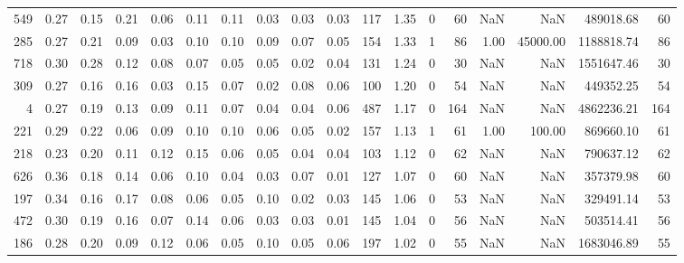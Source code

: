 \begin{tabular}{rrrrrrrrrrllrrrrrr}
          549 & 0.27 & 0.15 & 0.21 & 0.06 & 0.11 & 0.11 & 0.03 & 0.03 & 0.03 & 117 &  1.35 &                  0 &        60 &             NaN &                 NaN &     489018.68 &                    60 \\
          285 & 0.27 & 0.21 & 0.09 & 0.03 & 0.10 & 0.10 & 0.09 & 0.07 & 0.05 & 154 &  1.33 &                  1 &        86 &            1.00 &            45000.00 &    1188818.74 &                    86 \\
          718 & 0.30 & 0.28 & 0.12 & 0.08 & 0.07 & 0.05 & 0.05 & 0.02 & 0.04 & 131 &  1.24 &                  0 &        30 &             NaN &                 NaN &    1551647.46 &                    30 \\
          309 & 0.27 & 0.16 & 0.16 & 0.03 & 0.15 & 0.07 & 0.02 & 0.08 & 0.06 & 100 &  1.20 &                  0 &        54 &             NaN &                 NaN &     449352.25 &                    54 \\
            4 & 0.27 & 0.19 & 0.13 & 0.09 & 0.11 & 0.07 & 0.04 & 0.04 & 0.06 & 487 &  1.17 &                  0 &       164 &             NaN &                 NaN &    4862236.21 &                   164 \\
          221 & 0.29 & 0.22 & 0.06 & 0.09 & 0.10 & 0.10 & 0.06 & 0.05 & 0.02 & 157 &  1.13 &                  1 &        61 &            1.00 &              100.00 &     869660.10 &                    61 \\
          218 & 0.23 & 0.20 & 0.11 & 0.12 & 0.15 & 0.06 & 0.05 & 0.04 & 0.04 & 103 &  1.12 &                  0 &        62 &             NaN &                 NaN &     790637.12 &                    62 \\
          626 & 0.36 & 0.18 & 0.14 & 0.06 & 0.10 & 0.04 & 0.03 & 0.07 & 0.01 & 127 &  1.07 &                  0 &        60 &             NaN &                 NaN &     357379.98 &                    60 \\
          197 & 0.34 & 0.16 & 0.17 & 0.08 & 0.06 & 0.05 & 0.10 & 0.02 & 0.03 & 145 &  1.06 &                  0 &        53 &             NaN &                 NaN &     329491.14 &                    53 \\
          472 & 0.30 & 0.19 & 0.16 & 0.07 & 0.14 & 0.06 & 0.03 & 0.03 & 0.01 & 145 &  1.04 &                  0 &        56 &             NaN &                 NaN &     503514.41 &                    56 \\
          186 & 0.28 & 0.20 & 0.09 & 0.12 & 0.06 & 0.05 & 0.10 & 0.05 & 0.06 & 197 &  1.02 &                  0 &        55 &             NaN &                 NaN &    1683046.89 &                    55 \\

\end{tabular}
